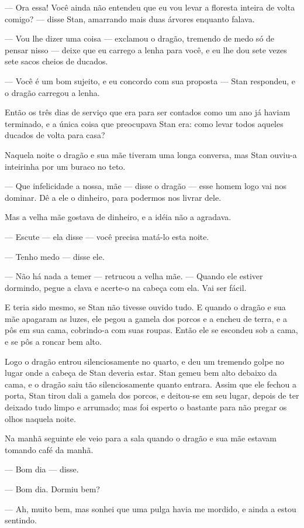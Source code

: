 — Ora essa! Você ainda não entendeu que eu vou levar a floresta
inteira de volta comigo? — disse Stan, amarrando mais duas árvores
enquanto falava.

— Vou lhe dizer uma coisa — exclamou o dragão, tremendo de medo só de
pensar nisso — deixe que eu carrego a lenha para você, e eu lhe dou
sete vezes sete sacos cheios de ducados.

— Você é um bom sujeito, e eu concordo com sua proposta — Stan
respondeu, e o dragão carregou a lenha.

Então os três dias de serviço que era para ser contados como um ano já
haviam terminado, e a única coisa que preocupava Stan era: como levar
todos aqueles ducados de volta para casa?

Naquela noite o dragão e sua mãe tiveram uma longa conversa, mas Stan
ouviu-a inteirinha por um buraco no teto.

— Que infelicidade a nossa, mãe — disse o dragão — esse homem logo vai
nos dominar. Dê a ele o dinheiro, para podermos nos livrar dele.

Mas a velha mãe gostava de dinheiro, e a idéia não a agradava.

— Escute — ela disse — você precisa matá-lo esta noite.

— Tenho medo — disse ele.

— Não há nada a temer — retrucou a velha mãe. — Quando ele estiver
dormindo, pegue a clava e acerte-o na cabeça com ela. Vai ser fácil.

E teria sido mesmo, se Stan não tivesse ouvido tudo. E quando o dragão
e sua mãe apagaram as luzes, ele pegou a gamela dos porcos e a encheu
de terra, e a pôs em sua cama, cobrindo-a com suas roupas. Então ele
se escondeu sob a cama, e se pôs a roncar bem alto.

Logo o dragão entrou silenciosamente no quarto, e deu um tremendo
golpe no lugar onde a cabeça de Stan deveria estar. Stan gemeu bem
alto debaixo da cama, e o dragão saiu tão silenciosamente quanto
entrara. Assim que ele fechou a porta, Stan tirou dali a gamela dos
porcos, e deitou-se em seu lugar, depois de ter deixado tudo limpo e
arrumado; mas foi esperto o bastante para não pregar os olhos naquela
noite.

Na manhã seguinte ele veio para a sala quando o dragão e sua mãe
estavam tomando café da manhã.

— Bom dia — disse.

— Bom dia. Dormiu bem?

— Ah, muito bem, mas sonhei que uma pulga havia me mordido, e ainda a
estou sentindo.

